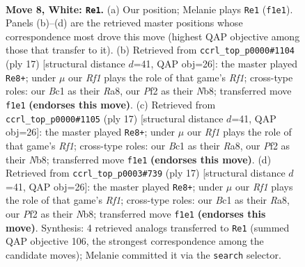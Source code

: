 \documentclass[11pt]{article}
\begin{document}
\begin{figure}[p]\centering
\begin{subfigure}{0.46\textwidth}\centering
\resizebox{\linewidth}{!}{%
\newchessgame
\chessboard[
  setfen={rnbqk2r/pp4pp/2pb1n2/3p1p2/3P4/5NP1/PP2PPBP/RNBQ1RK1 w kq - 0 8},
  showmover=false,
  pgfstyle=straightmove, color=movearrow, markmove={f1-e1}
]}
\caption{}
\end{subfigure}\hfill
\begin{subfigure}{0.46\textwidth}\centering
\resizebox{\linewidth}{!}{%
\newchessgame
\chessboard[
  setfen={rnbq1rk1/pp3pbp/3p1np1/2pP4/2P5/2NB1N1P/PP3PP1/R1BQK2R b KQ - 0 9},
  showmover=false,
  pgfstyle=straightmove, color=movearrow, markmove={f8-e8}
]}
\caption{}
\end{subfigure}
\\[4pt]
\begin{subfigure}{0.46\textwidth}\centering
\resizebox{\linewidth}{!}{%
\newchessgame
\chessboard[
  setfen={rnbq1rk1/pp3pbp/3p1np1/2pP4/2P5/2NB1N1P/PP3PP1/R1BQK2R b KQ - 0 9},
  showmover=false,
  pgfstyle=straightmove, color=movearrow, markmove={f8-e8}
]}
\caption{}
\end{subfigure}\hfill
\begin{subfigure}{0.46\textwidth}\centering
\resizebox{\linewidth}{!}{%
\newchessgame
\chessboard[
  setfen={rnbq1rk1/pp3pbp/3p1np1/2pP4/2P5/2NB1N1P/PP3PP1/R1BQK2R b KQ - 0 9},
  showmover=false,
  pgfstyle=straightmove, color=movearrow, markmove={f8-e8}
]}
\caption{}
\end{subfigure}
\caption{\textbf{Move 8, White: \texttt{Re1}.} (a) Our position; Melanie plays \texttt{Re1} (\texttt{f1e1}). Panels (b)--(d) are the retrieved master positions whose correspondence most drove this move (highest QAP objective among those that transfer to it). (b) Retrieved from \texttt{ccrl\_top\_p0000\#1104} (ply 17) [structural distance $d$=41, QAP obj=26]: the master played \texttt{Re8+}; under $\mu$ our \emph{Rf1} plays the role of that game's \emph{Rf1}; cross-type roles: our \emph{B}c1 as their \emph{R}a8, our \emph{P}f2 as their \emph{N}b8; transferred move \texttt{f1e1} \textbf{(endorses this move)}. (c) Retrieved from \texttt{ccrl\_top\_p0000\#1105} (ply 17) [structural distance $d$=41, QAP obj=26]: the master played \texttt{Re8+}; under $\mu$ our \emph{Rf1} plays the role of that game's \emph{Rf1}; cross-type roles: our \emph{B}c1 as their \emph{R}a8, our \emph{P}f2 as their \emph{N}b8; transferred move \texttt{f1e1} \textbf{(endorses this move)}. (d) Retrieved from \texttt{ccrl\_top\_p0003\#739} (ply 17) [structural distance $d$=41, QAP obj=26]: the master played \texttt{Re8+}; under $\mu$ our \emph{Rf1} plays the role of that game's \emph{Rf1}; cross-type roles: our \emph{B}c1 as their \emph{R}a8, our \emph{P}f2 as their \emph{N}b8; transferred move \texttt{f1e1} \textbf{(endorses this move)}. Synthesis: 4 retrieved analogs transferred to \texttt{Re1} (summed QAP objective 106, the strongest correspondence among the candidate moves); Melanie committed it via the \texttt{search} selector.}
\label{fig:thought-m14}
\end{figure}
\end{document}

